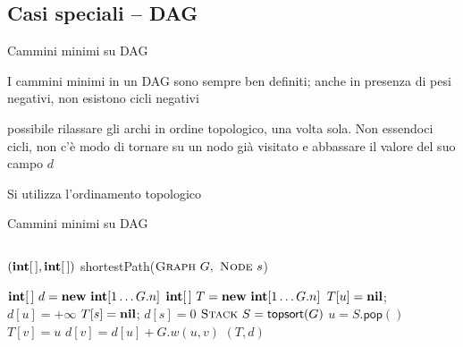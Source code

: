 \subsection{Casi speciali -- DAG}

\begin{frame}{Cammini minimi su DAG}

\vspace{-9pt}
I cammini minimi in un DAG sono sempre ben definiti; anche in presenza di
pesi negativi, non esistono cicli negativi


\pause

\EE possibile rilassare gli archi in ordine topologico, una volta sola. 
Non essendoci cicli, non c'è modo di tornare su un nodo già visitato e 
abbassare il valore del suo campo $d$

\BIL
\item Si utilizza l'ordinamento topologico
\EIL

\end{frame}

\begin{frame}{Cammini minimi su DAG}

\vspace{-24pt}
\begin{columns}
\begin{Procedure}
\caption[A]{$(\INTEGER[\,], \INTEGER[\,])$ \textsf{shortestPath}($\textsc{Graph}\ G,\ \textsc{Node}\ s$)}
$\INTEGER[\,]\ d = \NEW\ \INTEGER[1 \mldots G.n]$
$\INTEGER[\,]\ T = \NEW\ \INTEGER[1 \mldots G.n]$
{
  $T[u] = \textbf{nil}$; $d[u] = +\infty$\; 
}
$T[s] = \textbf{nil}$; $d[s] = 0$\; 
$\textsc{Stack}\ S = \textsf{topsort}(G)$\;
{
  $u = S.\textsf{pop}()$\;
  {
    {
      $T[v] = u$\;
      $d[v] = d[u] + G.w(u,v)$\;
    }
  }
}
\Return $(T,d)$
\end{Procedure}
\end{columns}

\end{frame}

